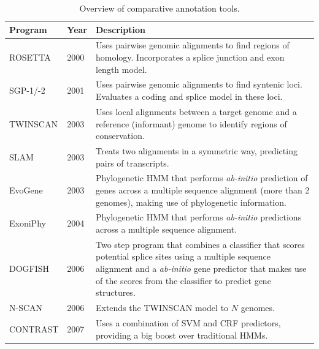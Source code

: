 \documentclass[fleqn,10pt]{wlscirep}
\begin{document}
\begin{table}[ht]
\centering
\begin{tabular}{|l|l|p{12cm}|}
\hline
Program & Year & Description \\
\hline
ROSETTA & 2000 \cite{batzoglou2000human} & Uses pairwise genomic alignments to find regions of homology. Incorporates a splice junction and exon length model. \\
\hline
SGP-1/-2 & 2001 \cite{wiehe2001sgp} & Uses pairwise genomic alignments to find syntenic loci. Evaluates a coding and splice model in these loci.  \\
\hline
TWINSCAN & 2003 \cite{flicek2003leveraging} & Uses local alignments between a target genome and a reference (informant) genome to identify regions of conservation. \\
\hline
SLAM & 2003 \cite{alexandersson2003slam} & Treats two alignments in a symmetric way, predicting pairs of transcripts. \\
\hline
EvoGene & 2003 \cite{pedersen2003gene} & Phylogenetic HMM that performs \textit{ab-initio} prediction of genes across a multiple sequence alignment (more than 2 genomes), making use of phylogenetic information. \\
\hline
ExoniPhy & 2004 \cite{siepel2004computational} & Phylogenetic HMM that performs \textit{ab-initio} predictions across a multiple sequence alignment. \\
\hline
DOGFISH & 2006 \cite{carter2006vertebrate} & Two step program that combines a classifier that scores potential splice sites using a multiple sequence alignment and a \textit{ab-initio} gene predictor that makes use of the scores from the classifier to predict gene structures. \\
\hline
N-SCAN & 2006 \cite{gross2006using} & Extends the TWINSCAN model to $N$ genomes. \\
\hline
CONTRAST & 2007 \cite{gross2007contrast} & Uses a combination of SVM and CRF predictors, providing a big boost over traditional HMMs. \\
\hline
\end{tabular}
\caption{\label{tab:history}Overview of comparative annotation tools.}
\end{table}
\end{document}
